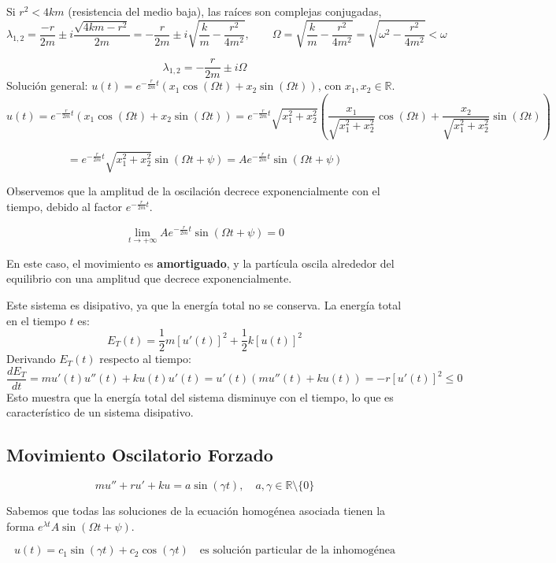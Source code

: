 Si $r^2 < 4km$ (resistencia del medio baja), las raíces son complejas conjugadas,
\[
    \lambda_{1,2} = \frac{-r}{2m} \pm i \frac{\sqrt{4km - r^2}}{2m} = -\frac{r}{2m} \pm i \sqrt{\frac{k}{m} - \frac{r^2}{4m^2}}, \qquad \Omega = \sqrt{\frac{k}{m} - \frac{r^2}{4m^2}} = \sqrt{\omega^2 - \frac{r^2}{4m^2}} < \omega
\]

\[
    \lambda_{1,2} = -\frac{r}{2m} \pm i \Omega
\]
Solución general: $u(t) = e^{-\frac{r}{2m} t} (x_1 \cos(\Omega t) + x_2 \sin(\Omega t))$, con $x_1, x_2 \in \mathbb{R}$. \\

\[
    u(t) = e^{-\frac{r}{2m} t} (x_1 \cos(\Omega t) + x_2 \sin(\Omega t)) = e^{-\frac{r}{2m} t} \sqrt{x_1^2 + x_2^2} \left( \frac{x_1}{\sqrt{x_1^2 + x_2^2}} \cos(\Omega t) + \frac{x_2}{\sqrt{x_1^2 + x_2^2}} \sin(\Omega t) \right)
\]

\[
    = e^{-\frac{r}{2m} t} \sqrt{x_1^2 + x_2^2} \sin(\Omega t + \psi) = A e^{-\frac{r}{2m} t} \sin(\Omega t + \psi)
\]

Observemos que la amplitud de la oscilación decrece exponencialmente con el tiempo, debido al factor $e^{-\frac{r}{2m} t}$. 

\[
    \lim_{t \to +\infty} A e^{-\frac{r}{2m} t} \sin(\Omega t + \psi) = 0
\]

En este caso, el movimiento es \textbf{amortiguado}, y la partícula oscila alrededor del equilibrio con una amplitud que decrece exponencialmente.

Este sistema es disipativo, ya que la energía total no se conserva. La energía total en el tiempo $t$ es:
\[
    E_T(t) = \frac{1}{2} m [u'(t)]^2 + \frac{1}{2} k [u(t)]^2
\]
Derivando $E_T(t)$ respecto al tiempo:
\[
    \frac{dE_T}{dt} = m u'(t) u''(t) + k u(t) u'(t) = u'(t) (m u''(t) + k u(t)) = -r [u'(t)]^2 \leq 0
\]
Esto muestra que la energía total del sistema disminuye con el tiempo, lo que es característico de un sistema disipativo.

\subsection{Movimiento Oscilatorio Forzado}

\[
    mu''+ru'+ku = a \sin(\gamma t), \quad a, \gamma \in \mathbb{R} \setminus \{0\}
\]

Sabemos que todas las soluciones de la ecuación homogénea asociada tienen la forma $e^{\lambda t} A \sin(\Omega t + \psi)$.

\[
    u(t) = c_1 \sin(\gamma t) + c_2 \cos(\gamma t) \quad \text{es solución particular de la inhomogénea}
\]

